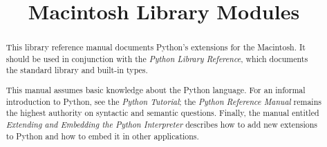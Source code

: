 \documentclass{howto}
\title{Macintosh Library Modules}
\begin{document}
\maketitle



\begin{abstract}

\noindent
This library reference manual documents Python's extensions for the
Macintosh.  It should be used in conjunction with the \emph{Python
Library Reference}, which documents the standard library and built-in
types.

This manual assumes basic knowledge about the Python language.  For an
informal introduction to Python, see the \emph{Python Tutorial}; the
\emph{Python Reference Manual} remains the highest authority on
syntactic and semantic questions.  Finally, the manual entitled
\emph{Extending and Embedding the Python Interpreter} describes how to
add new extensions to Python and how to embed it in other applications.

\end{abstract}

\tableofcontents














%
%

\renewcommand{\indexname}{Module Index}

\renewcommand{\indexname}{Index}
\end{document}
